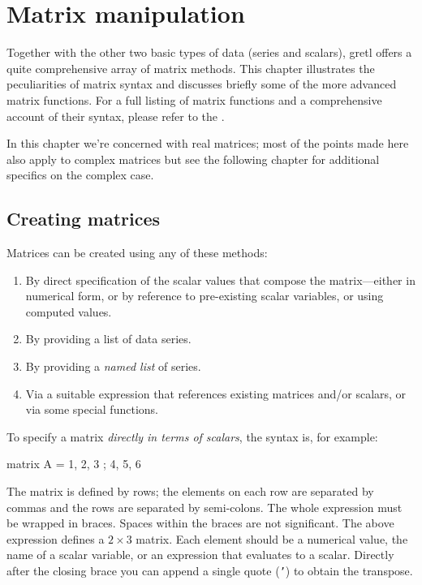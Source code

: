 \chapter{Matrix manipulation}
\label{chap:matrices}

Together with the other two basic types of data (series and scalars),
gretl offers a quite comprehensive array of matrix methods. This
chapter illustrates the peculiarities of matrix syntax and discusses
briefly some of the more advanced matrix functions. For a full listing
of matrix functions and a comprehensive account of their syntax,
please refer to the \GCR.

In this chapter we're concerned with real matrices; most of the points
made here also apply to complex matrices but see the following chapter
for additional specifics on the complex case.

\section{Creating matrices}
\label{sec:matrix-create}

Matrices can be created using any of these methods:

\begin{enumerate}
\item By direct specification of the scalar values that compose the
  matrix---either in numerical form, or by reference to pre-existing
  scalar variables, or using computed values.
\item By providing a list of data series.
\item By providing a \textit{named list} of series.
\item Via a suitable expression that references existing matrices
  and/or scalars, or via some special functions.
\end{enumerate}

To specify a matrix \textit{directly in terms of scalars}, the syntax
is, for example:

\begin{code}
matrix A = {1, 2, 3 ; 4, 5, 6}
\end{code}

The matrix is defined by rows; the elements on each row are separated
by commas and the rows are separated by semi-colons.  The whole
expression must be wrapped in braces.  Spaces within the braces are
not significant.  The above expression defines a $2\times3$ matrix.
Each element should be a numerical value, the name of a scalar
variable, or an expression that evaluates to a scalar.  Directly after
the closing brace you can append a single quote (\texttt{'}) to obtain
the transpose.

